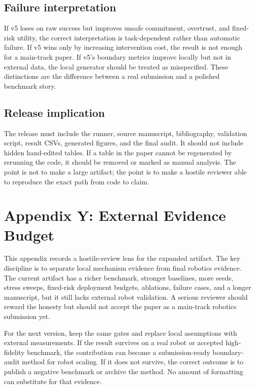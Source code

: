 \documentclass{article}
\begin{document}
\subsection{Failure interpretation}
If v5 loses on raw success but improves unsafe commitment, overtrust, and fixed-risk utility, the correct interpretation is task-dependent rather than automatic failure. If v5 wins only by increasing intervention cost, the result is not enough for a main-track paper. If v5's boundary metrics improve locally but not in external data, the local generator should be treated as misspecified. These distinctions are the difference between a real submission and a polished benchmark story.

\subsection{Release implication}
The release must include the runner, source manuscript, bibliography, validation script, result CSVs, generated figures, and the final audit. It should not include hidden hand-edited tables. If a table in the paper cannot be regenerated by rerunning the code, it should be removed or marked as manual analysis. The point is not to make a large artifact; the point is to make a hostile reviewer able to reproduce the exact path from code to claim.


\section{Appendix Y: External Evidence Budget}
This appendix records a hostile-review lens for the expanded artifact. The key discipline is to separate local mechanism evidence from final robotics evidence. The current artifact has a richer benchmark, stronger baselines, more seeds, stress sweeps, fixed-risk deployment budgets, ablations, failure cases, and a longer manuscript, but it still lacks external robot validation. A serious reviewer should reward the honesty but should not accept the paper as a main-track robotics submission yet.

For the next version, keep the same gates and replace local assumptions with external measurements. If the result survives on a real robot or accepted high-fidelity benchmark, the contribution can become a submission-ready boundary-audit method for robot scaling. If it does not survive, the correct outcome is to publish a negative benchmark or archive the method. No amount of formatting can substitute for that evidence.
\end{document}

